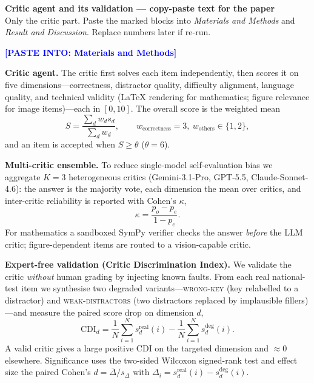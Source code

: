 \documentclass[11pt]{article}
\begin{document}
{\large\bfseries Critic agent and its validation --- copy-paste text for the paper}\\
{\small Only the critic part. Paste the marked blocks into \emph{Materials and
Methods} and \emph{Result and Discussion}. Replace numbers later if re-run.}

\hrulefill

\textcolor{blue}{\bfseries [PASTE INTO: Materials and Methods]}

\textbf{Critic agent.} The critic first solves each item independently, then
scores it on five dimensions---correctness, distractor quality, difficulty
alignment, language quality, and technical validity (\LaTeX{} rendering for
mathematics; figure relevance for image items)---each in $[0,10]$.
The overall score is the weighted mean
\begin{equation}
S=\frac{\sum_{d} w_d s_d}{\sum_{d} w_d},\qquad w_{\text{correctness}}=3,\ w_{\text{others}}\in\{1,2\},
\end{equation}
and an item is accepted when $S\ge\theta$ ($\theta=6$).

\textbf{Multi-critic ensemble.} To reduce single-model self-evaluation bias we
aggregate $K=3$ heterogeneous critics (Gemini-3.1-Pro, GPT-5.5,
Claude-Sonnet-4.6): the answer is the majority vote, each dimension the mean
over critics, and inter-critic reliability is reported with Cohen's $\kappa$,
\begin{equation}
\kappa=\frac{p_o-p_e}{1-p_e}.
\end{equation}
For mathematics a sandboxed SymPy verifier checks the answer \emph{before} the
LLM critic; figure-dependent items are routed to a vision-capable critic.

\textbf{Expert-free validation (Critic Discrimination Index).} We validate the
critic \emph{without} human grading by injecting known faults. From each real
national-test item we synthesise two degraded variants---\textsc{wrong-key}
(key relabelled to a distractor) and \textsc{weak-distractors} (two distractors
replaced by implausible fillers)---and measure the paired score drop on
dimension $d$,
\begin{equation}
\mathrm{CDI}_d=\frac1N\sum_{i=1}^{N}s_d^{\text{real}}(i)-\frac1N\sum_{i=1}^{N}s_d^{\text{deg}}(i).
\end{equation}
A valid critic gives a large positive $\mathrm{CDI}$ on the targeted dimension
and $\approx 0$ elsewhere. Significance uses the two-sided Wilcoxon signed-rank
test and effect size the paired Cohen's $d=\overline{\Delta}/s_\Delta$ with
$\Delta_i=s_d^{\text{real}}(i)-s_d^{\text{deg}}(i)$.
\end{document}
